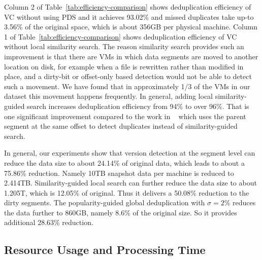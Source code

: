Column 2 of Table~\ref{tab:efficiency-comparison} shows deduplication efficiency of VC without 
using PDS and it achieves 93.02\% and  missed duplicates take  up-to  3.56\% of the original space, which
is about 356GB per physical machine. 
Column 1 of Table~\ref{tab:efficiency-comparison} shows deduplication efficiency of VC without 
local similarity search.
The reason similarity search provides such an improvement is that
there are VMs in which
data  segments are moved to another location on disk, for example when a file is rewritten
rather than modified in place,  
and a dirty-bit or offset-only based detection would not be able to detect such a movement.
We have found that in
approximately 1/3 of the VMs in our dataset this movement happens frequently.
In general, adding local similarity-guided search increases deduplication efficiency from 94\% to over 96\%.
That is one significant improvement compared to the work in ~\cite{WeiZhangIEEE}
which uses the parent segment at the same offset to detect duplicates instead of similarity-guided search.

In general, our experiments show that
version detection at the segment level can reduce the data size to about 24.14\% of original data, 
which leads to about a 75.86\% reduction. Namely 10TB snapshot data per machine is reduced to 2.414TB.
Similarity-guided local search can further reduce the data size
to about 1.205T, which is  12.05\% of original. Thus it delivers a 50.08\% reduction to the dirty segments.
The popularity-guided global deduplication with $\sigma=2\% $
reduces the data further to 860GB, namely 8.6\% of the original size. 
So it provides additional 28.63\% reduction. 


\subsection{Resource Usage and Processing Time}

